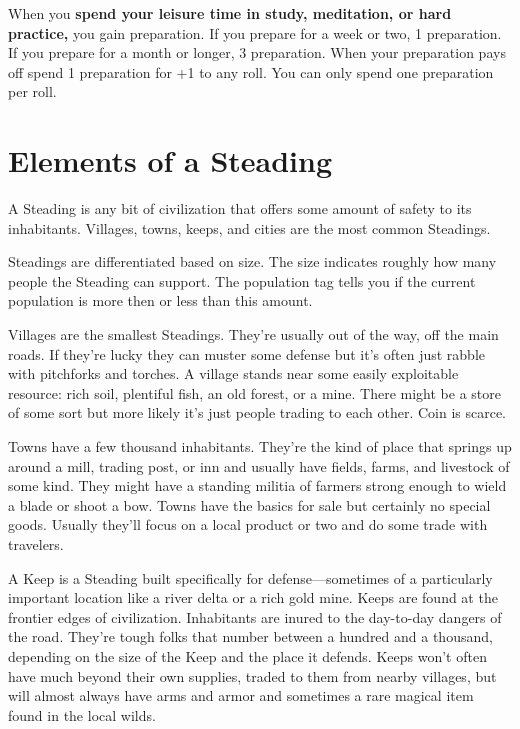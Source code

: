 When you {\bf spend your leisure time in study, meditation, or hard practice,}  you gain preparation. If you prepare for a week or two, 1 preparation. If you prepare for a month or longer, 3 preparation. When your preparation pays off spend 1 preparation for +1 to any roll. You can only spend one preparation per roll.

 
\section{Elements of a Steading}   
 

A Steading is any bit of civilization that offers some amount of safety to its inhabitants. Villages, towns, keeps, and cities are the most common Steadings.

 

Steadings are differentiated based on size. The size indicates roughly how many people the Steading can support. The population tag tells you if the current population is more then or less than this amount.

 

Villages are the smallest Steadings. They're usually out of the way, off the main roads. If they're lucky they can muster some defense but it's often just rabble with pitchforks and torches. A village stands near some easily exploitable resource: rich soil, plentiful fish, an old forest, or a mine. There might be a store of some sort but more likely it's just people trading to each other. Coin is scarce.

 

Towns have a few thousand inhabitants. They're the kind of place that springs up around a mill, trading post, or inn and usually have fields, farms, and livestock of some kind. They might have a standing militia of farmers strong enough to wield a blade or shoot a bow. Towns have the basics for sale but certainly no special goods. Usually they'll focus on a local product or two and do some trade with travelers.

 

A Keep is a Steading built specifically for defense—sometimes of a particularly important location like a river delta or a rich gold mine. Keeps are found at the frontier edges of civilization. Inhabitants are inured to the day-to-day dangers of the road. They're tough folks that number between a hundred and a thousand, depending on the size of the Keep and the place it defends. Keeps won't often have much beyond their own supplies, traded to them from nearby villages, but will almost always have arms and armor and sometimes a rare magical item found in the local wilds.

